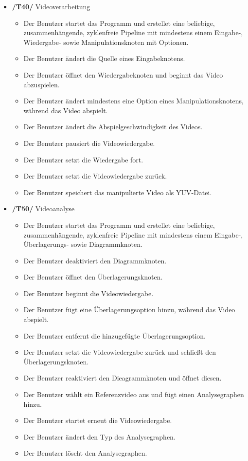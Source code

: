 \begin{itemize}
\begin{itemize}
		\end{itemize}
\newpage
	\item\textbf{/T40/} Videoverarbeitung
		\begin{itemize}
			\item Der Benutzer startet das Programm und erstellet eine beliebige, zusammenhängende, zyklenfreie Pipeline mit mindestens einem Eingabe-, Wiedergabe- sowie 
				Manipulationsknoten mit Optionen.
			\item Der Benutzer ändert die Quelle eines Eingabeknotens.
			\item Der Benutzer öffnet den Wiedergabeknoten und beginnt das Video abzuspielen.
			\item Der Benutzer ändert mindestens eine Option eines Manipulationsknotens, während das Video abspielt.
			\item Der Benutzer ändert die Abspielgeschwindigkeit des Videos.
			\item Der Benutzer pausiert die Videowiedergabe.
			\item Der Benutzer setzt die Wiedergabe fort.
			\item Der Benutzer setzt die Videowiedergabe zurück.
			\item Der Benutzer speichert das manipulierte Video als YUV-Datei.
		\end{itemize}
	\item\textbf{/T50/} Videoanalyse
		\begin{itemize}
			\item Der Benutzer startet das Programm und erstellet eine beliebige, zusammenhängende, zyklenfreie Pipeline mit mindestens einem Eingabe-, Überlagerungs- sowie 
				Diagrammknoten.
			\item Der Benutzer deaktiviert den Diagrammknoten.
			\item Der Benutzer öffnet den Überlagerungsknoten.
			\item Der Benutzer beginnt die Videowiedergabe.
			\item Der Benutzer fügt eine Überlagerungsoption hinzu, während das Video abspielt.
			\item Der Benutzer entfernt die hinzugefügte Überlagerungsoption.
			\item Der Benutzer setzt die Videowiedergabe zurück und schließt den Überlagerungsknoten.
			\item Der Benutzer reaktiviert den Dieagrammknoten und öffnet diesen.
			\item Der Benutzer wählt ein Referenzvideo aus und fügt einen Analysegraphen hinzu.
			\item Der Benutzer startet erneut die Videowiedergabe.
			\item Der Benutzer ändert den Typ des Analysegraphen.
			\item Der Benutzer löscht den Analysegraphen.
		\end{itemize}
\end{itemize}

